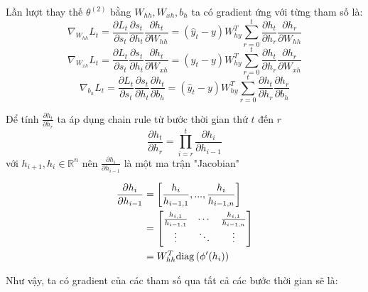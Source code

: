 Lần lượt thay thế $\theta^{(2)}$ bằng $W_{hh}, W_{xh}, b_h$ ta có gradient ứng với từng tham số là:
\begin{equation} \label{gradientWRTSt12}
	\nabla_{W_{hh}}L_t = \frac{\partial L_t}{\partial s_t} \frac{\partial s_t}{\partial h_t} \frac{\partial h_t}{\partial W_{hh}}  =  (\hat{y}_t - y) W_{hy}^T \sum_{r=0}^{t} \frac{\partial h_{t}}{\partial h_r} \frac{\partial h_r}{\partial W_{hh}}
\end{equation}
\begin{equation} \label{gradientWRTSt13}
	\nabla_{W_{xh}}L_t = \frac{\partial L_t}{\partial s_t} \frac{\partial s_t}{\partial h_t} \frac{\partial h_t}{\partial W_{xh}}  =  (\hat{y}_t - y) W_{hy}^T \sum_{r=0}^{t} \frac{\partial h_{t}}{\partial h_r} \frac{\partial h_r}{\partial W_{xh}}
\end{equation}
\begin{equation} \label{gradientWRTSt14}
	\nabla_{b_h}L_t = \frac{\partial L_t}{\partial s_t} \frac{\partial s_t}{\partial h_t} \frac{\partial h_t}{\partial b_h}  =  (\hat{y}_t - y) W_{hy}^T \sum_{r=0}^{t} \frac{\partial h_{t}}{\partial h_r} \frac{\partial h_r}{\partial b_h}
\end{equation}

Để tính $\frac{\partial h_t}{\partial h_r}$ ta áp dụng chain rule từ bước thời gian thứ $t$ đến $r$
\begin{equation} \label{gradientWRTSt15}
	\frac{\partial h_t}{\partial h_r} = \prod_{i=r}^{t} \frac{\partial h_{i}}{\partial h_{i-1}}
\end{equation}
với $h_{i+1},h_i \in \mathbb{R}^n$ nên $\frac{\partial h_{i}}{\partial h_{i-1}}$ là một ma trận "Jacobian"

\begin{equation} \label{gradientWRTSt16}
\begin{split}
	\frac{\partial h_{i}}{\partial h_{i-1}} &= \left[ \frac{h_{i}}{h_{i-1,1}}, ..., \frac{h_{i}}{h_{i-1,n}} \right] \\
	&= \begin{bmatrix}
  	\frac{h_{i, 1}}{h_{i-1,1}} & \cdots & \frac{h_{i,1}}{h_{i-1,n}}\\
   	\vdots & \ddots & \vdots\\
   	\end{bmatrix} \\
   	&= W_{hh}^T \mathrm{diag} \left( \phi'(h_i) \right)
\end{split} 
\end{equation}

Như vậy, ta có gradient của các tham số qua tất cả các bước thời gian sẽ là:

